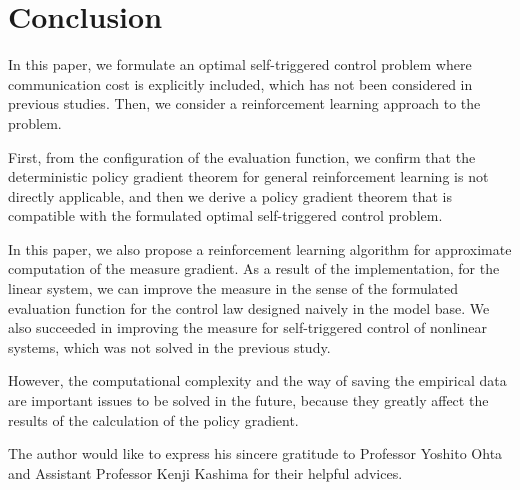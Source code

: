 \documentclass[english, dvipdfmx]{ampmt}             %
\begin{document}
\section{Conclusion}
In this paper, we formulate an optimal self-triggered control problem where communication cost is explicitly included, which has not been considered in previous studies. Then, we consider a reinforcement learning approach to the problem.  \par
First, from the configuration of the evaluation function, we confirm that the deterministic policy gradient theorem for general reinforcement learning is not directly applicable, and then we derive a policy gradient theorem that is compatible with the formulated optimal self-triggered control problem. \par
In this paper, we also propose a reinforcement learning algorithm for approximate computation of the measure gradient. As a result of the implementation, for the linear system, we can improve the measure in the sense of the formulated evaluation function for the control law designed naively in the model base. We also succeeded in improving the measure for self-triggered control of nonlinear systems, which was not solved in the previous study. \par
However, the computational complexity and the way of saving the empirical data are important issues to be solved in the future, because they greatly affect the results of the calculation of the policy gradient.

\acknowledgment
The author would like to express his sincere gratitude to Professor
Yoshito Ohta and Assistant Professor Kenji Kashima for their helpful advices.
\end{document}
